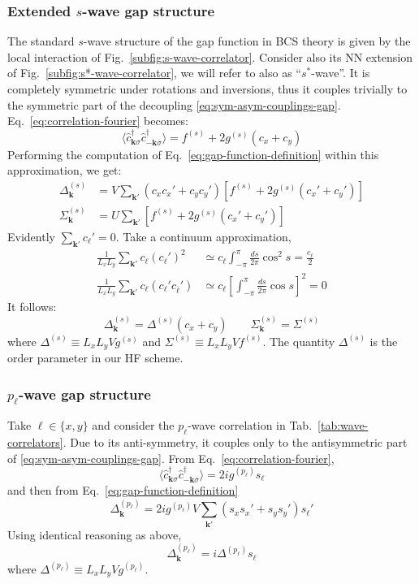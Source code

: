 \subsubsection*{Extended $s$-wave gap structure}\label{subsubsec:swave-gap-structure}

The standard $s$-wave structure of the gap function in BCS theory is given by the local interaction of Fig.~\ref{subfig:s-wave-correlator}. Consider also its NN extension of Fig.~\ref{subfig:s*-wave-correlator}, we will refer to also as ``$s^*$-wave''. It is completely symmetric under rotations and inversions, thus it couples trivially to the symmetric part of the decoupling \eqref{eq:sym-asym-couplings-gap}. Eq.~\eqref{eq:correlation-fourier} becomes:
\[
	\langle 
	\hat c_{\mathbf{k}\sigma}^\dagger \hat c_{-\mathbf{k} \overline{\sigma}}^\dagger
	\rangle = f^{(s)} + 2g^{(s)} (c_x + c_y)
\]
Performing the computation of Eq.~\eqref{eq:gap-function-definition} within this approximation, we get:
\[
\begin{aligned}
	\Delta_\mathbf{k}^{(s)} &= V \sum_{\mathbf{k}'} (c_x c_x' + c_y c_y') \left[
		f^{(s)} + 2g^{(s)}(c_x' + c_y')
	\right] \\
	\Sigma_\mathbf{k}^{(s)} &= U \sum_{\mathbf{k}'} \left[
		f^{(s)} + 2g^{(s)}(c_x' + c_y')
	\right]
\end{aligned}
\]
Evidently $\sum_{\mathbf{k}'} c_\ell' = 0$. Take a continuum approximation,
\[
\begin{aligned}
	\frac{1}{L_x L _y}\sum_{\mathbf{k}'} c_\ell (c_\ell')^2 &\simeq c_\ell \int_{-\pi}^\pi \frac{ds}{2\pi} \cos^2 s = \frac{c_\ell}{2} \\
	\frac{1}{L_x L _y}\sum_{\mathbf{k}'} c_\ell (c_\ell' c_{\overline{\ell}}') &\simeq c_\ell \left[ \int_{-\pi}^\pi \frac{ds}{2\pi} \cos s \right]^2 = 0
\end{aligned}
\]
It follows:
\begin{equation}\label{eq:swave-gap}
	\Delta_\mathbf{k}^{(s)} = \Delta^{(s)} (c_x + c_y)
	\qquad
	\Sigma_\mathbf{k}^{(s)} = \Sigma^{(s)}
\end{equation}
where $\Delta^{(s)} \equiv L_x L_y V g^{(s)}$ and $\Sigma^{(s)} \equiv L_x L_y V f^{(s)}$. The quantity $\Delta^{(s)}$ is the order parameter in our HF scheme.

\subsubsection{$p_\ell$-wave gap structure}

Take $\ell \in \lbrace x,y \rbrace$ and consider the $p_\ell$-wave correlation in Tab.~\ref{tab:wave-correlators}. Due to its anti-symmetry, it couples only to the antisymmetric part of \eqref{eq:sym-asym-couplings-gap}. From Eq.~\eqref{eq:correlation-fourier},
\[
	\langle 
		\hat c_{\mathbf{k}\sigma}^\dagger \hat c_{-\mathbf{k} \overline{\sigma}}^\dagger
	\rangle = 2i g^{(p_\ell)} s_\ell
\]
and then from Eq.~\eqref{eq:gap-function-definition}
\[
	\Delta_\mathbf{k}^{(p_\ell)} = 2i g^{(p_\ell)} V \sum_{\mathbf{k}'} (s_x s_x' + s_y s_y') s_\ell'
\]
Using identical reasoning as above,
\[
	\Delta_\mathbf{k}^{(p_\ell)} = i \Delta^{(p_\ell)} s_\ell
\]
where $\Delta^{(p_\ell)} \equiv L_x L_y V g^{(p_\ell)}$.

